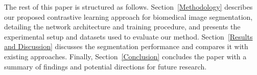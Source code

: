 \documentclass[./dissertation.tex]{subfiles}
\begin{document}
\label{PaperStructure}
The rest of this paper is structured as follows. Section~\ref{Methodology} describes our proposed contrastive learning approach for biomedical image segmentation, detailing the network architecture and training procedure, and presents the experimental setup and datasets used to evaluate our method. Section~\ref{Results and Discussion} discusses the segmentation performance and compares it with existing approaches. Finally, Section~\ref{Conclusion} concludes the paper with a summary of findings and potential directions for future research.








\end{document}

